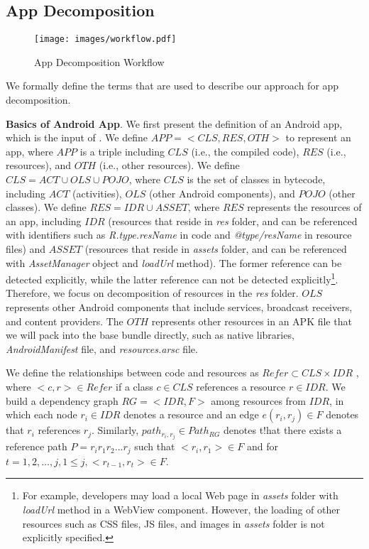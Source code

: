 \subsection{App Decomposition}


\begin{figure}[!tbp]
    \texttt{[image: images/workflow.pdf]}
    \caption {App Decomposition Workflow}
    \label{fig:workflow}
\end{figure}


We formally define the terms that are used to describe our approach for app decomposition.

\noindent\textbf{Basics of Android App}.
We first present the definition of an Android app, which is the input of \nickName.
We define $APP=<CLS, RES, OTH>$ to represent an app, where $APP$ is a triple including $CLS$ (i.e., the compiled code), $RES$ (i.e., resources), and $OTH$ (i.e., other resources). 
We define $CLS= ACT\cup OLS \cup POJO$, where $CLS$  is the set of classes in bytecode, including $ACT$ (activities), $OLS$ (other Android components), and $POJO$ (other classes). 
We define $RES=IDR\cup ASSET$, where $RES$ represents the resources of an app, including $IDR$ (resources that reside in \textit{res} folder, and can be referenced with identifiers such as \textit{R.type.resName} in code and \textit{@type/resName} in resource files) and $ASSET$ (resources that reside in \textit{assets} folder, and can be referenced with \textit{AssetManager} object and \textit{loadUrl} method). The former reference can be detected explicitly, while the latter reference can not be detected explicitly\footnote{For example, developers may load a local Web page in \textit{assets} folder with \textit{loadUrl} method in a WebView component. However, the loading of other resources such as CSS files, JS files, and images in \textit{assets} folder is not explicitly specified.}. Therefore, we focus on decomposition of resources in the \textit{res} folder. 
$OLS$ represents other Android components that include services, broadcast receivers, and content providers.
The $OTH$ represents other resources in an APK file that we will pack into the base bundle directly, such as native libraries, \textit{AndroidManifest} file, and \textit{resources.arsc} file.


We define the relationships between code and resources as $Refer\subset CLS\times IDR$ , where $<c,r> \in Refer$ if a class $c\in CLS$ references a resource $r\in IDR$. We build a dependency graph $RG=<IDR, F>$ among resources from $IDR$, in which each node $r_i\in IDR$ denotes a resource and an edge $e(r_i,r_j)\in F$ denotes that $r_i$ references $r_j$. Similarly, $path_{r_i,r_j} \in Path_{RG}$ denotes t!hat there exists a reference path $P=r_ir_1r_2\dots r_j$ such that $<r_i,r_1>\in F$ and for $t=1,2,\dots,j, 1\le j, <r_{t-1}, r_t>\in F$. 

